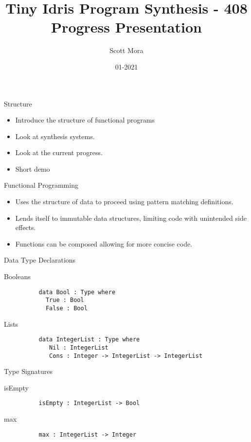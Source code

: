 \documentclass[presentation]{beamer}
\author{Scott Mora}
\date{01-2021}
\title{Tiny Idris Program Synthesis - 408 Progress Presentation}
\begin{document}
\maketitle

\begin{frame}[fragile]{Structure}
  \begin{itemize}
  \item {Introduce the structure of functional programs}
  \item {Look at synthesis systems.}
  \item {Look at the current progress.}
  \item {Short demo}
  \end{itemize}
\end{frame}

\begin{frame}[fragile]{Functional Programming}
  \begin{itemize}
  \item {Uses the structure of data to proceed using
    pattern matching definitions.}
  \item {Lends itself to immutable data structures, limiting
    code with unintended side effects.}
  \item {Functions can be composed allowing for more
    concise code.}
  \end{itemize}
\end{frame}

\begin{frame}[fragile]{Data Type Declarations}
      \begin{block}{Booleans}
        \begin{verbatim}
          data Bool : Type where
            True : Bool
            False : Bool
        \end{verbatim}
      \end{block}
    
      \begin{block}{Lists}
        \begin{verbatim}
          data IntegerList : Type where
             Nil : IntegerList 
             Cons : Integer -> IntegerList -> IntegerList
        \end{verbatim}
      \end{block}
\end{frame}

\begin{frame}[fragile]{Type Signatures}
      \begin{block}{isEmpty}
        \begin{verbatim}
          isEmpty : IntegerList -> Bool
        \end{verbatim}
      \end{block}
      \begin{block}{max}
        \begin{verbatim}
          max : IntegerList -> Integer
        \end{verbatim}
      \end{block}
\end{frame}
\end{document}
